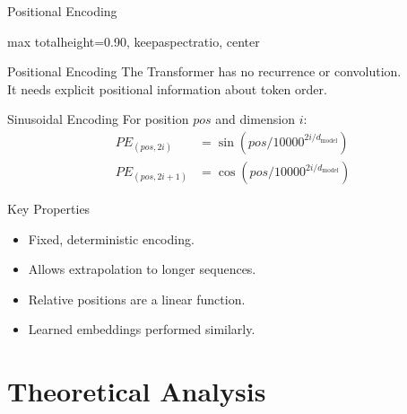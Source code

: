 \documentclass[
	11pt,
	aspectratio=169,
]{beamer}
\begin{document}
\begin{frame}{Positional Encoding}
\begin{adjustbox}{max totalheight=0.90\textheight, keepaspectratio, center}
\begin{minipage}{\linewidth}
\centering
\begin{alertblock}{Positional Encoding}
    The Transformer has no recurrence or convolution.\\
    It needs explicit positional information about token order.
\end{alertblock}

\vspace{-0.2em}
\begin{block}{Sinusoidal Encoding}
    For position $pos$ and dimension $i$:
    \begin{align*}
        PE_{(pos, 2i)}   &= \sin\left(pos / 10000^{2i/d_{\text{model}}}\right) \\
        PE_{(pos, 2i+1)} &= \cos\left(pos / 10000^{2i/d_{\text{model}}}\right)
    \end{align*}
\end{block}

\vspace{-0.2em}
\begin{block}{Key Properties}
    \begin{itemize}
        \setlength{\itemsep}{0pt}
        \item Fixed, deterministic encoding.
        \item Allows extrapolation to longer sequences.
        \item Relative positions are a linear function.
        \item Learned embeddings performed similarly.
    \end{itemize}
\end{block}
\end{minipage}
\end{adjustbox}
\end{frame}



\section{Theoretical Analysis}
\end{document}
